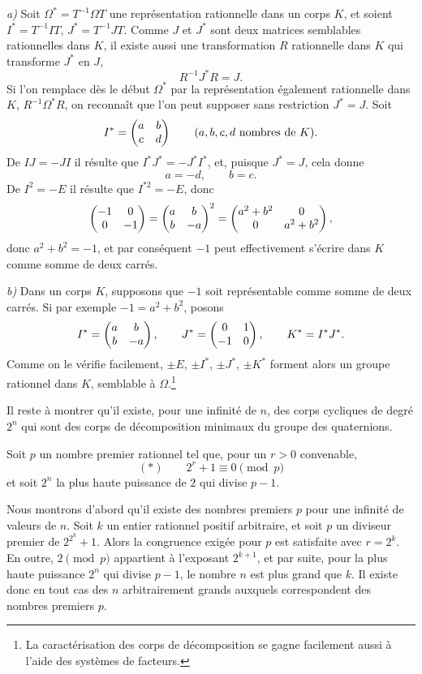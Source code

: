\emph{a)} Soit $\Omega^*=T^{-1}\Omega T$ une représentation rationnelle dans un corps $K$, et soient $I^*=T^{-1}IT$, $J^*=T^{-1}JT$. Comme $J$ et $J^*$ sont deux matrices semblables rationnelles dans $K$, il existe aussi une transformation $R$ rationnelle dans $K$ qui transforme $J^*$ en $J$,
\[
        R^{-1}J^*R=J.
\]
Si l'on remplace dès le début $\Omega^*$ par la représentation également rationnelle dans $K$, $R^{-1}\Omega^*R$, on reconnaît que l'on peut supposer sans restriction $J^*=J$. Soit
\[
        I^*=\begin{pmatrix}a&b\\ c&d\end{pmatrix}\qquad (a,b,c,d\text{ nombres de }K).
\]
De $IJ=-JI$ il résulte que $I^*J^*=-J^*I^*$, et, puisque $J^*=J$, cela donne
\[
        a=-d,
        \qquad b=c.
\]
De $I^2=-E$ il résulte que $I^{*2}=-E$, donc
\[
        \begin{pmatrix}-1&0\\0&-1\end{pmatrix}=\begin{pmatrix}a&b\\ b&-a\end{pmatrix}^2
        =\begin{pmatrix}a^2+b^2&0\\0&a^2+b^2\end{pmatrix},
\]
donc $a^2+b^2=-1$, et par conséquent $-1$ peut effectivement s'écrire dans $K$ comme somme de deux carrés.

\emph{b)} Dans un corps $K$, supposons que $-1$ soit représentable comme somme de deux carrés. Si par exemple $-1=a^2+b^2$, posons
\[
        I^*=\begin{pmatrix}a&b\\ b&-a\end{pmatrix},\qquad
        J^*=\begin{pmatrix}0&1\\-1&0\end{pmatrix},\qquad
        K^*=I^*J^*.
\]
Comme on le vérifie facilement, $\pm E$, $\pm I^*$, $\pm J^*$, $\pm K^*$ forment alors un groupe rationnel dans $K$, semblable à $\Omega$.\footnote{La caractérisation des corps de décomposition se gagne facilement aussi à l'aide des systèmes de facteurs.}

Il reste à montrer qu'il existe, pour une infinité de $n$, des corps cycliques de degré $2^n$ qui sont des corps de décomposition minimaux du groupe des quaternions.

Soit $p$ un nombre premier rationnel tel que, pour un $r>0$ convenable,
\[
        (*)\qquad 2^r+1\equiv0\pmod p
\]
et soit $2^n$ la plus haute puissance de $2$ qui divise $p-1$.

Nous montrons d'abord qu'il existe des nombres premiers $p$ pour une infinité de valeurs de $n$. Soit $k$ un entier rationnel positif arbitraire, et soit $p$ un diviseur premier de $2^{2^k}+1$. Alors la congruence exigée pour $p$ est satisfaite avec $r=2^k$. En outre, $2\pmod p$ appartient à l'exposant $2^{k+1}$, et par suite, pour la plus haute puissance $2^n$ qui divise $p-1$, le nombre $n$ est plus grand que $k$. Il existe donc en tout cas des $n$ arbitrairement grands auxquels correspondent des nombres premiers $p$.

